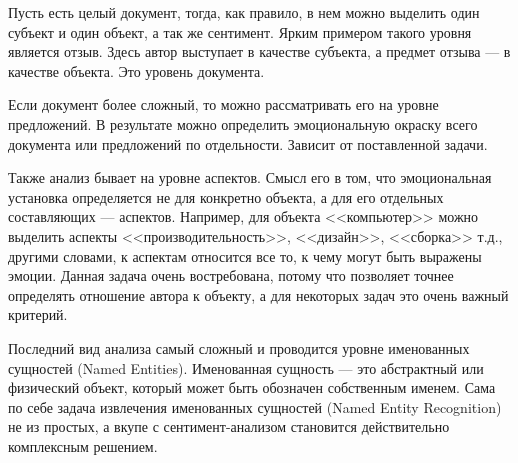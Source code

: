 \bigskip\par
Пусть есть целый документ, тогда, как правило, в нем можно выделить один субъект и один объект, а так же
сентимент. Ярким примером такого уровня является отзыв. Здесь автор выступает в качестве субъекта, а предмет
отзыва --- в качестве объекта. Это уровень документа.

\bigskip\par
Если документ более сложный, то можно рассматривать его на уровне предложений. В результате можно определить
эмоциональную окраску всего документа или предложений по отдельности. Зависит от поставленной задачи.

\bigskip\par
Также анализ бывает на уровне аспектов. Смысл его в том, что эмоциональная установка определяется не для
конкретно объекта, а для его отдельных составляющих --- аспектов. Например, для объекта <<компьютер>> можно
выделить аспекты <<производительность>>, <<дизайн>>, <<сборка>> т.д., другими словами, к аспектам относится
все то, к чему могут быть выражены эмоции. Данная задача очень востребована, потому что позволяет точнее
определять отношение автора к объекту, а для некоторых задач это очень важный критерий.

\bigskip\par
Последний вид анализа самый сложный и проводится уровне именованных сущностей (Named Entities). Именованная
сущность --- это абстрактный или физический объект, который может быть обозначен собственным именем. Сама по
себе задача извлечения именованных сущностей (Named Entity Recognition) не из простых, а вкупе с
сентимент-анализом становится действительно комплексным решением.


